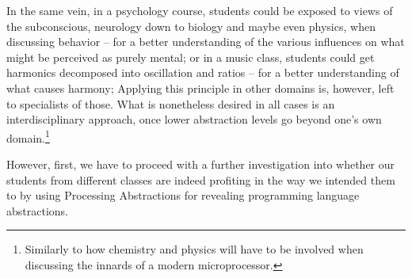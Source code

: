 In the same vein, in a psychology course, students could be exposed to views of the subconscious, neurology down to biology and maybe even physics, when discussing behavior -- for a better understanding of the various influences on what might be perceived as purely mental; or in a music class, students could get harmonics decomposed into oscillation and ratios -- for a better understanding of what causes harmony; \etc Applying this principle in other domains is, however, left to specialists of those. What is nonetheless desired in all cases is an interdisciplinary approach, once lower abstraction levels go beyond one's own domain.\footnote{Similarly to how chemistry and physics will have to be involved when discussing the innards of a modern microprocessor.}

However, first, we have to proceed with a further investigation into whether our students from different classes are indeed profiting in the way we intended them to by using Processing Abstractions for revealing programming language abstractions.
